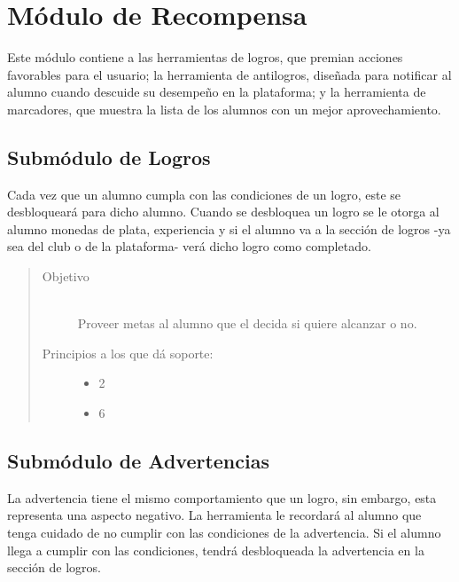 

\chapter{Módulo de Recompensa}
\label{mod:recompensa}

    Este módulo contiene a las herramientas de logros, que premian acciones favorables para el usuario; la herramienta de antilogros, diseñada para notificar al alumno cuando descuide su desempeño en la plataforma; y la herramienta de marcadores, que muestra la lista de los alumnos con un mejor aprovechamiento.

\section{Submódulo de Logros}

    Cada vez que un alumno cumpla con las condiciones de un logro, este se desbloqueará para dicho alumno. Cuando se desbloquea un logro se le otorga al alumno monedas de plata, experiencia y si el alumno va a la sección de logros -ya sea del club o de la plataforma- verá dicho logro como completado.
    
    \begin{quote}
    \begin{description}
    \item[Objetivo] \hfill\\
        Proveer metas al alumno que el decida si quiere alcanzar o no.
    
    \item[Principios a los que dá soporte:] \hfill
        \begin{itemize}
            \item 2 \principioII
            \item 6 \principioVI
        \end{itemize}
    \end{description}
    \end{quote}
    
\section{Submódulo de Advertencias}

    La advertencia tiene el mismo comportamiento que un logro, sin embargo, esta representa una aspecto negativo. La herramienta le recordará al alumno que tenga cuidado de no cumplir con las condiciones de la advertencia. Si el alumno llega a cumplir con las condiciones, tendrá desbloqueada la advertencia en la sección de logros.
    

